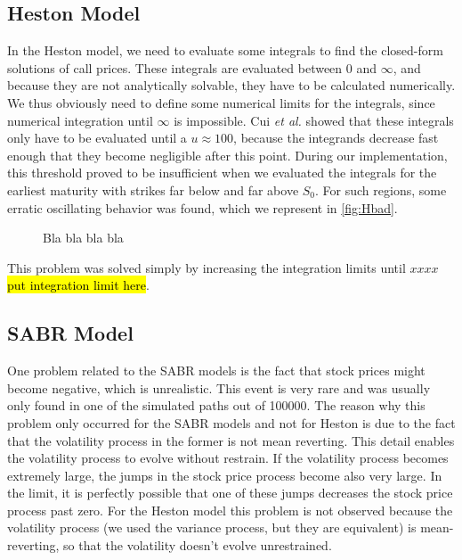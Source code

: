 \subsection{Heston Model}
In the Heston model, we need to evaluate some integrals to find the closed-form solutions of call prices.
These integrals are evaluated between $0$ and $\infty$, and because they are not analytically solvable, they have to be calculated numerically.
We thus obviously need to define some numerical limits for the integrals, since numerical integration until $\infty$ is impossible. Cui \textit{et al.}\citep{Cui} showed that these integrals only have to be evaluated until a $u\approx100$, because the integrands decrease fast enough that they become negligible after this point. During our implementation, this threshold proved to be insufficient when we evaluated the integrals for the earliest maturity with strikes far below and far above $S_0$. For such regions, some erratic oscillating behavior was found, which we represent in \autoref{fig:Hbad}.

\begin{figure}[H]
  \begin{subfigmatrix}{2}
  \end{subfigmatrix}
    \caption[Bla bla bla bla]{Bla bla bla bla}\label{fig:Hbad}
\end{figure} 

This problem was solved simply by increasing the integration limits until $xxxx$ \hl{put integration limit here}.



\subsection{SABR Model}
One problem related to the SABR models is the fact that stock prices might become negative, which is unrealistic. This event is very rare and was usually only found in one of the simulated paths out of 100000.
The reason why this problem only occurred for the SABR models and not for Heston is due to the fact that the volatility process in the former is not mean reverting.
This detail enables the volatility process to evolve without restrain. If the volatility process becomes extremely large, the jumps in the stock price process become also very large. In the limit, it is perfectly possible that one of these jumps decreases the stock price process past zero. For the Heston model this problem is not observed because the volatility process (we used the variance process, but they are equivalent) is mean-reverting, so that the volatility doesn't evolve unrestrained.

